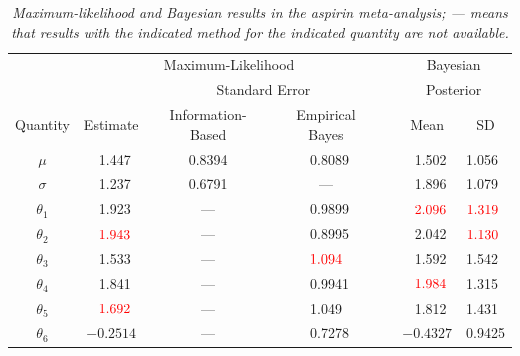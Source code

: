 \documentclass[12pt]{article}
\newcommand{\tcr}[1]{\textcolor{red}{#1}}
\begin{document}
\begin{table}[t!]

\centering

\caption{\textit{Maximum-likelihood and Bayesian results in the aspirin meta-analysis; --- means that results with the indicated method for the indicated quantity are not available.}}

\label{t:ml-bayes-comparison}

\bigskip

\begin{tabular}{c||ccc|ccl}

\multicolumn{1}{c}{} & \multicolumn{3}{c}{Maximum-Likelihood} & & \multicolumn{2}{c}{Bayesian} \\ \cline{2-4}

\multicolumn{1}{c}{} & & \multicolumn{2}{c}{Standard Error} & & \multicolumn{2}{c}{Posterior} \\ \cline{3-4} \cline{6-7}

\multicolumn{1}{c}{Quantity} & Estimate & Information-Based & \multicolumn{1}{c}{Empirical Bayes} & & Mean & \multicolumn{1}{c}{SD} \\

\hline

$\mu$ & \ 1.447 & 0.8394 & \ 0.8089 & & \ 1.502 & 1.056 \\

$\sigma$ & \ 1.237 & 0.6791 & --- & & \ 1.896 & 1.079 \\

$\theta_1$ & \ 1.923 & --- & \ 0.9899 & &\  $\tcr{2.096}$ & $\tcr{1.319}$\\

$\theta_2$ &\ $\tcr{1.943}$ & --- & \ 0.8995 & & \ 2.042 & $\tcr{1.130}$ \\

$\theta_3$ & \ 1.533 & --- &$\tcr{1.094}$ & & \ 1.592 & 1.542 \\

$\theta_4$ & \ 1.841 & --- & \ 0.9941 & &\ $\tcr{1.984}$ & 1.315 \\

$\theta_5$ &\ $\tcr{1.692}$ & --- & 1.049 & & \ 1.812 & 1.431 \\

$\theta_6$ & $-0.2514$ & --- & \ 0.7278 & & $-0.4327$ & 0.9425 \\

\end{tabular}

\end{table}
\end{document}
